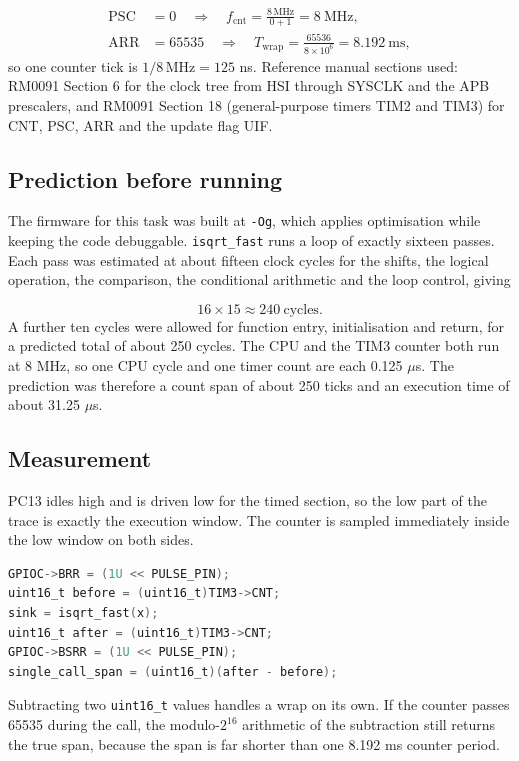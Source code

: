 \documentclass[11pt]{article}
\begin{document}
\begin{align*}
\text{PSC} &= 0 \quad \Rightarrow \quad
f_{\text{cnt}} = \frac{8\,\text{MHz}}{0 + 1} = 8~\text{MHz}, \\
\text{ARR} &= 65535 \quad \Rightarrow \quad
T_{\text{wrap}} = \frac{65536}{8 \times 10^{6}} = 8.192~\text{ms},
\end{align*}
\noindent
so one counter tick is $1/8\,\text{MHz} = 125$ ns.
\noindent
Reference manual sections used: RM0091 Section 6 for the clock tree from HSI
through SYSCLK and the APB prescalers, and RM0091 Section 18 (general-purpose
timers TIM2 and TIM3) for CNT, PSC, ARR and the update flag UIF.

\subsection{Prediction before running}

The firmware for this task was built at \texttt{-Og}, which applies
optimisation while keeping the code debuggable. \texttt{isqrt\_fast} runs a
loop of exactly sixteen passes. Each pass was estimated at about fifteen clock
cycles for the shifts, the logical operation, the comparison, the conditional
arithmetic and the loop control, giving

\[
16 \times 15 \approx 240~\text{cycles}.
\]
\noindent
A further ten cycles were allowed for function entry, initialisation and
return, for a predicted total of about 250 cycles. The CPU and the TIM3 counter
both run at 8 MHz, so one CPU cycle and one timer count are each 0.125 $\mu$s.
The prediction was therefore a count span of about 250 ticks and an execution
time of about 31.25 $\mu$s.

\subsection{Measurement}

PC13 idles high and is driven low for the timed section, so the low part of the
trace is exactly the execution window. The counter is sampled immediately
inside the low window on both sides.

\begin{lstlisting}[language=C]
GPIOC->BRR = (1U << PULSE_PIN);
uint16_t before = (uint16_t)TIM3->CNT;
sink = isqrt_fast(x);
uint16_t after = (uint16_t)TIM3->CNT;
GPIOC->BSRR = (1U << PULSE_PIN);
single_call_span = (uint16_t)(after - before);
\end{lstlisting}
\noindent
Subtracting two \texttt{uint16\_t} values handles a wrap on its own. If the
counter passes 65535 during the call, the modulo-$2^{16}$ arithmetic of the
subtraction still returns the true span, because the span is far shorter than
one 8.192 ms counter period.
\end{document}

